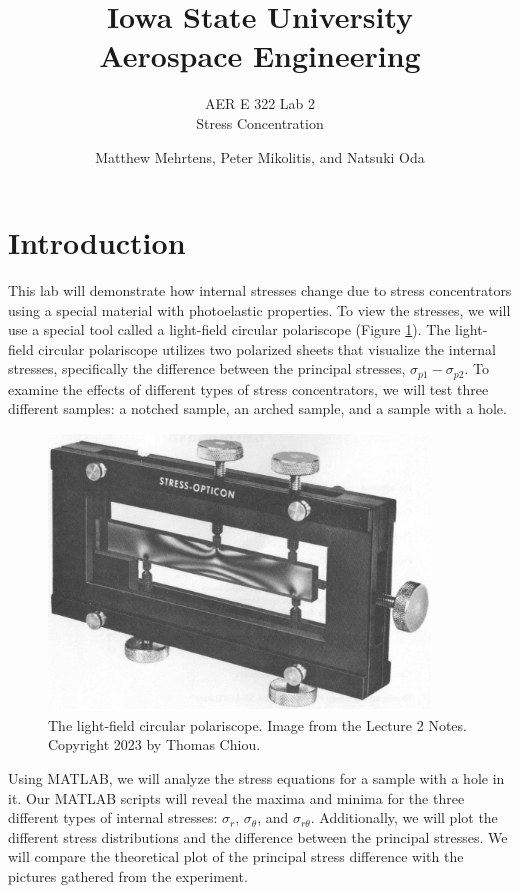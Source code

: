 \documentclass[12 pt]{article}
\title{\textbf{Iowa State University
\\{\Large Aerospace Engineering}}}
\subtitle{AER E 322 Lab 2\\
		  Stress Concentration}
\author{Matthew Mehrtens, Peter Mikolitis, and Natsuki Oda}
\begin{document}
\maketitle
\tableofcontents
\section{Introduction} \label{introduction}
This lab will demonstrate how internal stresses change due to stress concentrators using a special material with photoelastic properties. To view the stresses, we will use a special tool called a light-field circular polariscope (Figure \ref{fig:apparatus}). The light-field circular polariscope utilizes two polarized sheets that visualize the internal stresses, specifically the difference between the principal stresses, $\sigma_{p1}-\sigma_{p2}$. To examine the effects of different types of stress concentrators, we will test three different samples: a notched sample, an arched sample, and a sample with a hole.

\begin{figure}[htbp]
\centering
\includegraphics[width=4in]{images/Apparatus}
\caption{The light-field circular polariscope. Image from the Lecture 2 Notes. Copyright 2023 by Thomas Chiou.}
\label{fig:apparatus}
\end{figure}

Using MATLAB, we will analyze the stress equations for a sample with a hole in it. Our MATLAB scripts will reveal the maxima and minima for the three different types of internal stresses: $\sigma_r$, $\sigma_\theta$, and $\sigma_{r\theta}$. Additionally, we will plot the different stress distributions and the difference between the principal stresses. We will compare the theoretical plot of the principal stress difference with the pictures gathered from the experiment.
\end{document}
